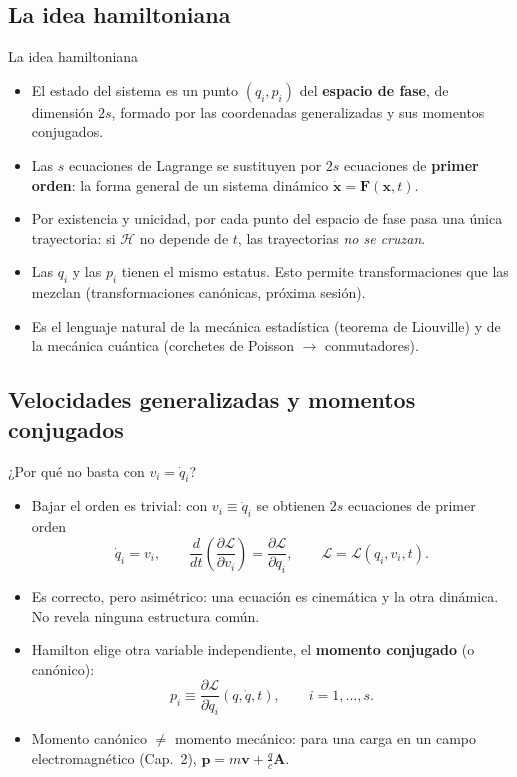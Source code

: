 \documentclass[spanish]{beamer}
\newcommand{\Lag}{\mathcal{L}}               %
\newcommand{\Ham}{\mathcal{H}}               %
\newcommand{\pd}[2]{\frac{\partial #1}{\partial #2}}
\begin{document}
\subsection{La idea hamiltoniana}
\begin{frame}{La idea hamiltoniana}
\begin{itemize}[<+->]
  \item El estado del sistema es un punto $(q_i,p_i)$ del \textbf{espacio de fase},
        de dimensión $2s$, formado por las coordenadas generalizadas y sus momentos conjugados.
  \item Las $s$ ecuaciones de Lagrange se sustituyen por $2s$ ecuaciones de
        \textbf{primer orden}: la forma general de un sistema dinámico
        $\dot{\mathbf{x}}=\mathbf{F}(\mathbf{x},t)$.
  \item Por existencia y unicidad, por cada punto del espacio de fase pasa una única
        trayectoria: si $\Ham$ no depende de $t$, las trayectorias \emph{no se cruzan}.
  \item Las $q_i$ y las $p_i$ tienen el mismo estatus. Esto permite transformaciones
        que las mezclan (transformaciones canónicas, próxima sesión).
  \item Es el lenguaje natural de la mecánica estadística (teorema de Liouville) y de la
        mecánica cuántica (corchetes de Poisson $\to$ conmutadores).
\end{itemize}
\end{frame}

\subsection{Velocidades generalizadas y momentos conjugados}
\begin{frame}{¿Por qué no basta con $v_i=\dot q_i$?}
\begin{itemize}[<+->]
  \item Bajar el orden es trivial: con $v_i\equiv\dot q_i$ se obtienen $2s$ ecuaciones
        de primer orden
        \[
          \dot q_i=v_i,\qquad
          \frac{d}{dt}\left(\pd{\Lag}{v_i}\right)=\pd{\Lag}{q_i},
          \qquad \Lag=\Lag(q_i,v_i,t).
        \]
  \item Es correcto, pero asimétrico: una ecuación es cinemática y la otra dinámica.
        No revela ninguna estructura común.
  \item Hamilton elige otra variable independiente, el \textbf{momento conjugado}
        (o canónico):
        \[
          p_i\equiv\pd{\Lag}{\dot q_i}(q,\dot q,t),\qquad i=1,\dots,s .
        \]
  \item \alert{Momento canónico $\neq$ momento mecánico}: para una carga en un
        campo electromagnético (Cap.~2), $\mathbf p=m\mathbf v+\frac{q}{c}\mathbf A$.
\end{itemize}
\end{frame}
\end{document}
